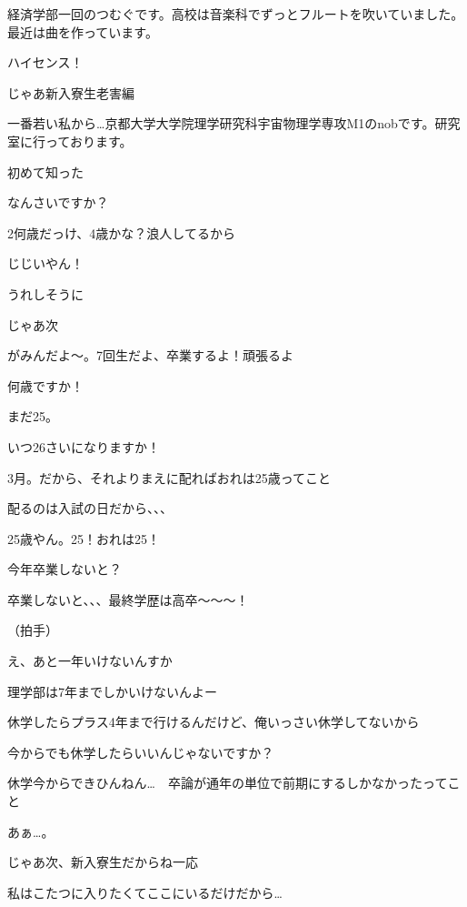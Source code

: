 \begin{multicols}{2}
  経済学部一回のつむぐです。高校は音楽科でずっとフルートを吹いていました。最近は曲を作っています。

  ハイセンス！
  

  じゃあ新入寮生老害編

  一番若い私から…京都大学大学院理学研究科宇宙物理学専攻M1のnobです。研究室に行っております。

  初めて知った

  なんさいですか？

  2何歳だっけ、4歳かな？浪人してるから

  じじいやん！

  うれしそうに

  じゃあ次

  がみんだよ～。7回生だよ、卒業するよ！頑張るよ

  何歳ですか！

  まだ25。

  いつ26さいになりますか！

  3月。だから、それよりまえに配ればおれは25歳ってこと

  配るのは入試の日だから、、、

  25歳やん。25！おれは25！

  今年卒業しないと？

  卒業しないと、、、最終学歴は高卒～～～！

  （拍手）

  え、あと一年いけないんすか

  理学部は7年までしかいけないんよー

  休学したらプラス4年まで行けるんだけど、俺いっさい休学してないから

  今からでも休学したらいいんじゃないですか？

  休学今からできひんねん…　卒論が通年の単位で前期にするしかなかったってこと

  あぁ…。

  じゃあ次、新入寮生だからね一応

  私はこたつに入りたくてここにいるだけだから…


\end{multicols}
